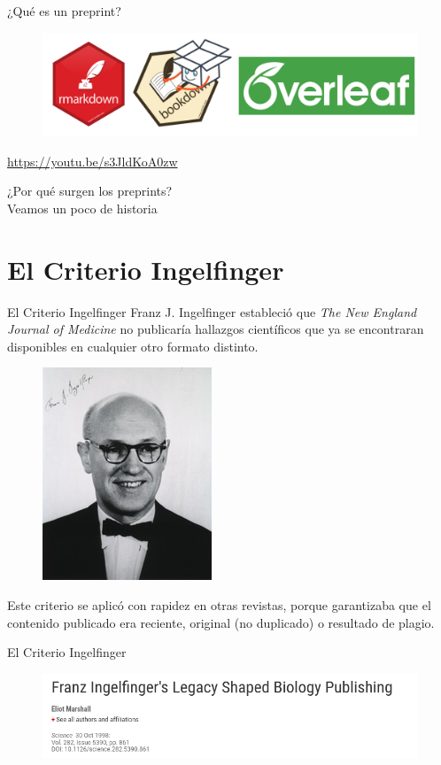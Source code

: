 \documentclass{beamer}
\begin{document}
\begin{frame}{¿Qué es un preprint?}
\begin{figure}
\centering
 \includegraphics[width=.9\textwidth]{Tools.png}
\end{figure}
\textcolor{blue}{\url{https://youtu.be/s3JldKoA0zw}}
\end{frame}

\begin{frame}
\Huge
\centering
¿Por qué surgen los preprints?\\
\vspace{1.5cm}
\pause
Veamos un poco de historia
\end{frame}

\section{El Criterio Ingelfinger}
\begin{frame}{El Criterio Ingelfinger}
Franz J. Ingelfinger estableció que \textit{The New England Journal of Medicine} no publicaría hallazgos científicos que ya se encontraran disponibles en cualquier otro formato distinto.
\begin{figure}
\centering
 \includegraphics[width=.25\textwidth]{Ingelfinger}
\end{figure}
Este criterio se aplicó con rapidez en otras revistas, porque garantizaba que el contenido publicado era reciente, original (no duplicado) o resultado de plagio.
\end{frame}

\begin{frame}{El Criterio Ingelfinger}
\begin{figure}
\centering
 \includegraphics[width=.9\textwidth]{Science}
\end{figure}
\end{frame}
\end{document}
